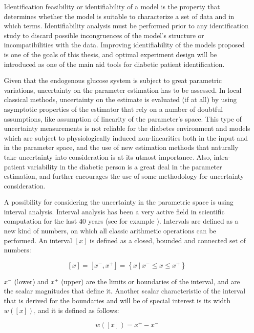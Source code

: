 Identification feasibility or identifiability of a model is the property that determines whether the model is suitable to characterize a set of data and in which terms. Identifiability analysis must be performed prior to any identification study to discard possible incongruences of the model's structure or incompatibilities with the data. Improving identifiability of the models proposed is one of the goals of this thesis, and optimal experiment design will be introduced as one of the main aid tools for diabetic patient identification.

Given that the endogenous glucose system is subject to great parametric variations, uncertainty on the parameter estimation has to be assessed. In local classical methods, uncertainty on the estimate is evaluated (if at all) by using asymptotic properties of the estimator that rely on a number of doubtful assumptions, like assumption of linearity of the parameter's space. This type of uncertainty measurements is not reliable for the diabetes environment and models which are subject to physiologically induced non-linearities both in the input and in the parameter space, and the use of new estimation methods that naturally take uncertainty into consideration is at its utmost importance. Also, intra-patient variability in the diabetic person is a great deal in the parameter estimation, and further encourages the use of some methodology for uncertainty consideration.

A possibility for considering the uncertainty in the parametric space is using interval analysis. Interval analysis has been a very active field in scientific computation for the last 40 years (see for example \cite{moore1979methods}). Intervals are defined as a new kind of numbers, on which all classic arithmetic operations can be performed. An interval $[x]$ is defined as a closed, bounded and connected set of numbers:

\begin{equation}
  \left[ x \right] = \left[ x^{-},x^{+} \right] = \left\{ x \: | \: x^{-}\leq x \leq x^{+}\right\}
\label{eq:intervaldef}
\end{equation}

$x^{-}$ (lower) and $x^{+}$ (upper) are the limits or boundaries of the interval, and are the scalar magnitudes that define it. Another scalar characteristic of the interval that is derived for the boundaries and will be of special interest is its width $w\left(\left[x\right]\right)$, and it is defined as follows:

\begin{equation}
   w\left(\left[x\right]\right)= x^{+}-x^{-}
\label{eq:intervalwidth}
\end{equation}

